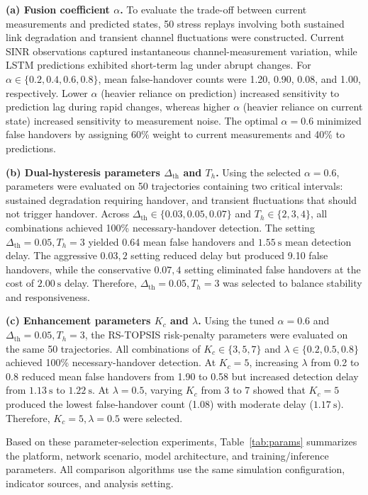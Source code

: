 \documentclass[preprint,12pt]{elsarticle}
\begin{document}
\textbf{(a) Fusion coefficient $\alpha$.} To evaluate the trade-off between current measurements and predicted states, 50 stress replays involving both sustained link degradation and transient channel fluctuations were constructed. Current SINR observations captured instantaneous channel-measurement variation, while LSTM predictions exhibited short-term lag under abrupt changes. For $\alpha\in\{0.2, 0.4, 0.6, 0.8\}$, mean false-handover counts were 1.20, 0.90, 0.08, and 1.00, respectively. Lower $\alpha$ (heavier reliance on prediction) increased sensitivity to prediction lag during rapid changes, whereas higher $\alpha$ (heavier reliance on current state) increased sensitivity to measurement noise. The optimal $\alpha=0.6$ minimized false handovers by assigning 60\% weight to current measurements and 40\% to predictions.

\textbf{(b) Dual-hysteresis parameters $\Delta_{\mathrm{th}}$ and $T_h$.} Using the selected $\alpha=0.6$, parameters were evaluated on 50 trajectories containing two critical intervals: sustained degradation requiring handover, and transient fluctuations that should not trigger handover. Across $\Delta_{\mathrm{th}}\in\{0.03, 0.05, 0.07\}$ and $T_h\in\{2, 3, 4\}$, all combinations achieved 100\% necessary-handover detection. The setting $\Delta_{\mathrm{th}}=0.05, T_h=3$ yielded 0.64 mean false handovers and $1.55~\mathrm{s}$ mean detection delay. The aggressive $0.03, 2$ setting reduced delay but produced 9.10 false handovers, while the conservative $0.07, 4$ setting eliminated false handovers at the cost of $2.00~\mathrm{s}$ delay. Therefore, $\Delta_{\mathrm{th}}=0.05, T_h=3$ was selected to balance stability and responsiveness.

\textbf{(c) Enhancement parameters $K_c$ and $\lambda$.} Using the tuned $\alpha=0.6$ and $\Delta_{\mathrm{th}}=0.05, T_h=3$, the RS-TOPSIS risk-penalty parameters were evaluated on the same 50 trajectories. All combinations of $K_c\in\{3, 5, 7\}$ and $\lambda\in\{0.2, 0.5, 0.8\}$ achieved 100\% necessary-handover detection. At $K_c=5$, increasing $\lambda$ from 0.2 to 0.8 reduced mean false handovers from 1.90 to 0.58 but increased detection delay from $1.13~\mathrm{s}$ to $1.22~\mathrm{s}$. At $\lambda=0.5$, varying $K_c$ from 3 to 7 showed that $K_c=5$ produced the lowest false-handover count (1.08) with moderate delay ($1.17~\mathrm{s}$). Therefore, $K_c=5, \lambda=0.5$ were selected.

Based on these parameter-selection experiments, Table~\ref{tab:params} summarizes the platform, network scenario, model architecture, and training/inference parameters. All comparison algorithms use the same simulation configuration, indicator sources, and analysis setting.
\end{document}
